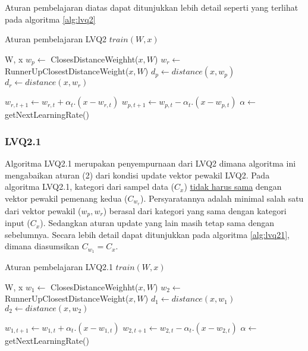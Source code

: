 \noindent 
Aturan pembelajaran diatas dapat ditunjukkan lebih detail seperti
yang terlihat pada algoritma \ref{alg:lvq2}

\begin{algorithm}  
\scriptsize 
\caption{Aturan pembelajaran LVQ2 $train(W, x)$}          
\label{alg:lvq2}                           
\begin{algorithmic}                    %
	\REQUIRE W, x
	\STATE $w_p \leftarrow $ ClosesDistanceWeighht($x, W$)
	\STATE $w_r \leftarrow $ RunnerUpClosestDistanceWeight($x, W$)
	\STATE $d_p \leftarrow distance(x, w_p)$
	\STATE $d_r \leftarrow distance(x, w_r)$
	
				\STATE $w_{r,t+1} \leftarrow w_{r,t} + \alpha_t . (x - w_{r,t})$
				\STATE $w_{p,t+1} \leftarrow w_{p,t} - \alpha_t . (x - w_{p,t})$
			\ENDIF
		\ENDIF
	\ENDIF
	\STATE $\alpha \leftarrow $ getNextLearningRate()
\end{algorithmic}
\end{algorithm}

\subsubsection*{LVQ2.1}
Algoritma LVQ2.1 merupakan penyempurnaan dari LVQ2 dimana algoritma ini
mengabaikan aturan (2) dari kondisi update vektor pewakil LVQ2. Pada algoritma
LVQ2.1, kategori dari sampel data ($C_x$) \underline{tidak harus sama} dengan
vektor pewakil pemenang kedua ($C_{w_r}$). Persyaratannya adalah minimal salah
satu dari vektor pewakil ($w_p, w_r$) berasal dari kategori yang sama dengan
kategori input ($C_x$). Sedangkan aturan update yang lain masih tetap sama
dengan sebelumnya. Secara lebih detail dapat ditunjukkan pada algoritma
\ref{alg:lvq21}, dimana diasumsikan $C_{w_1} = C_x$.

\begin{algorithm}  
\scriptsize 
\caption{Aturan pembelajaran LVQ2.1 $train(W, x)$}          
\label{alg:lvq21}                           
\begin{algorithmic}                    %
	\REQUIRE W, x
	\STATE $w_1 \leftarrow $ ClosesDistanceWeighht($x, W$)
	\STATE $w_2 \leftarrow $ RunnerUpClosestDistanceWeight($x, W$)
	\STATE $d_1 \leftarrow distance(x, w_1)$
	\STATE $d_2 \leftarrow distance(x, w_2)$
	
				\STATE $w_{1,t+1} \leftarrow w_{1,t} + \alpha_t . (x - w_{1,t})$
				\STATE $w_{2,t+1} \leftarrow w_{2,t} - \alpha_t . (x - w_{2,t})$
			\ENDIF
		\ENDIF
	\ENDIF
	\STATE $\alpha \leftarrow $ getNextLearningRate()
\end{algorithmic}
\end{algorithm}

